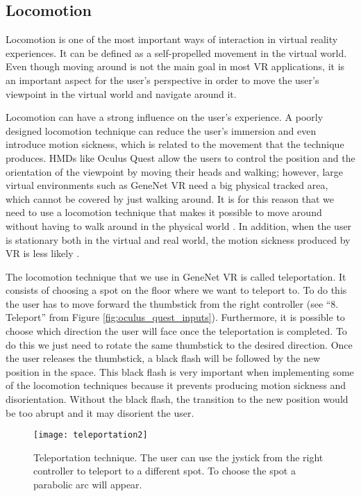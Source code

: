 \subsection{Locomotion}
Locomotion is one of the most important ways of interaction in virtual reality experiences. It can be defined as a self-propelled movement in the virtual world. Even though moving around is not the main goal in most VR applications, it is an important aspect for the user's perspective in order to move the user's viewpoint in the virtual world and navigate around it.

Locomotion can have a strong influence on the user's experience. A poorly designed locomotion technique can reduce the user's immersion and even introduce motion sickness, which is related to the movement that the technique produces. HMDs like Oculus Quest allow the users to control the position and the orientation of the viewpoint by moving their heads and walking; however, large virtual environments such as GeneNet VR need a big physical tracked area, which cannot be covered by just walking around. It is for this reason that we need to use a locomotion technique that makes it possible to move around without having to walk around in the physical world \cite{locomotion_technique}. In addition, when the user is stationary both in the virtual and real world, the motion sickness produced by VR is less likely \cite{effect_vr_sickness}.

The locomotion technique that we use in GeneNet VR is called teleportation. It consists of choosing a spot on the floor where we want to teleport to. To do this the user has to move forward the thumbstick from the right controller (see “8. Teleport” from Figure \ref{fig:oculus_quest_inputs}). Furthermore, it is possible to choose which direction the user will face once the teleportation is completed. To do this we just need to rotate the same thumbstick to the desired direction. Once the user releases the thumbstick, a black flash will be followed by the new position in the space. This black flash is very important when implementing some of the locomotion techniques because it prevents producing motion sickness and disorientation. Without the black flash, the transition to the new position would be too abrupt and it may disorient the user.

\begin{figure}[h!]
    \centering%
    \texttt{[image: teleportation2]}
    \caption{Teleportation technique. The user can use the jystick from the right controller to teleport to a different spot. To choose the spot a parabolic arc will appear.}
    \label{fig:teleportation}
\end{figure}%

